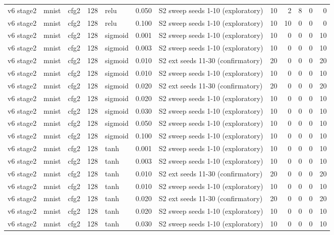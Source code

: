 \begin{table}[htbp]
{\begin{tabular}{@{}lllrlrlrrrrr@{}}
v6 stage2 & mnist & cfg2 & 128 & relu & 0.050 & S2 sweep seeds 1-10 (exploratory) & 10 & 2 & 8 & 0 & 0 \\
v6 stage2 & mnist & cfg2 & 128 & relu & 0.100 & S2 sweep seeds 1-10 (exploratory) & 10 & 10 & 0 & 0 & 0 \\
v6 stage2 & mnist & cfg2 & 128 & sigmoid & 0.001 & S2 sweep seeds 1-10 (exploratory) & 10 & 0 & 0 & 0 & 10 \\
v6 stage2 & mnist & cfg2 & 128 & sigmoid & 0.003 & S2 sweep seeds 1-10 (exploratory) & 10 & 0 & 0 & 0 & 10 \\
v6 stage2 & mnist & cfg2 & 128 & sigmoid & 0.010 & S2 ext seeds 11-30 (confirmatory) & 20 & 0 & 0 & 0 & 20 \\
v6 stage2 & mnist & cfg2 & 128 & sigmoid & 0.010 & S2 sweep seeds 1-10 (exploratory) & 10 & 0 & 0 & 0 & 10 \\
v6 stage2 & mnist & cfg2 & 128 & sigmoid & 0.020 & S2 ext seeds 11-30 (confirmatory) & 20 & 0 & 0 & 0 & 20 \\
v6 stage2 & mnist & cfg2 & 128 & sigmoid & 0.020 & S2 sweep seeds 1-10 (exploratory) & 10 & 0 & 0 & 0 & 10 \\
v6 stage2 & mnist & cfg2 & 128 & sigmoid & 0.030 & S2 sweep seeds 1-10 (exploratory) & 10 & 0 & 0 & 0 & 10 \\
v6 stage2 & mnist & cfg2 & 128 & sigmoid & 0.050 & S2 sweep seeds 1-10 (exploratory) & 10 & 0 & 0 & 0 & 10 \\
v6 stage2 & mnist & cfg2 & 128 & sigmoid & 0.100 & S2 sweep seeds 1-10 (exploratory) & 10 & 0 & 0 & 0 & 10 \\
v6 stage2 & mnist & cfg2 & 128 & tanh & 0.001 & S2 sweep seeds 1-10 (exploratory) & 10 & 0 & 0 & 0 & 10 \\
v6 stage2 & mnist & cfg2 & 128 & tanh & 0.003 & S2 sweep seeds 1-10 (exploratory) & 10 & 0 & 0 & 0 & 10 \\
v6 stage2 & mnist & cfg2 & 128 & tanh & 0.010 & S2 ext seeds 11-30 (confirmatory) & 20 & 0 & 0 & 0 & 20 \\
v6 stage2 & mnist & cfg2 & 128 & tanh & 0.010 & S2 sweep seeds 1-10 (exploratory) & 10 & 0 & 0 & 0 & 10 \\
v6 stage2 & mnist & cfg2 & 128 & tanh & 0.020 & S2 ext seeds 11-30 (confirmatory) & 20 & 0 & 0 & 0 & 20 \\
v6 stage2 & mnist & cfg2 & 128 & tanh & 0.020 & S2 sweep seeds 1-10 (exploratory) & 10 & 0 & 0 & 0 & 10 \\
v6 stage2 & mnist & cfg2 & 128 & tanh & 0.030 & S2 sweep seeds 1-10 (exploratory) & 10 & 0 & 0 & 0 & 10 \\

\end{tabular}}
\end{table}
